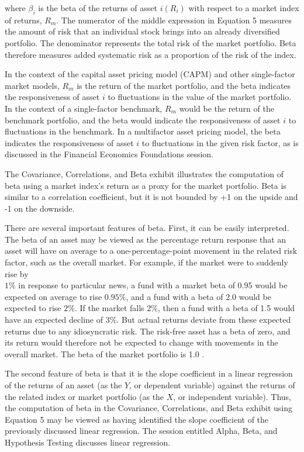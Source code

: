 \documentclass[11pt]{article}
\begin{document}
where $\beta_{i}$ is the beta of the returns of asset $i\left(R_{i}\right)$ with respect to a market index of returns, $R_{m}$. The numerator of the middle expression in Equation 5 measures the amount of risk that an individual stock brings into an already diversified portfolio. The denominator represents the total risk of the market portfolio. Beta therefore measures added systematic risk as a proportion of the risk of the index.

In the context of the capital asset pricing model (CAPM) and other single-factor market models, $R_{m}$ is the return of the market portfolio, and the beta indicates the responsiveness of asset $i$ to fluctuations in the value of the market portfolio. In the context of a single-factor benchmark, $R_{m}$ would be the return of the benchmark portfolio, and the beta would indicate the responsiveness of asset $i$ to fluctuations in the benchmark. In a multifactor asset pricing model, the beta indicates the responsiveness of asset $i$ to fluctuations in the given risk factor, as is discussed in the Financial Economics Foundations session.

The Covariance, Correlations, and Beta exhibit illustrates the computation of beta using a market index's return as a proxy for the market portfolio. Beta is similar to a correlation coefficient, but it is not bounded by +1 on the upside and -1 on the downside.

There are several important features of beta. First, it can be easily interpreted. The beta of an asset may be viewed as the percentage return response that an asset will have on average to a one-percentage-point movement in the related risk factor, such as the overall market. For example, if the market were to suddenly rise by\\
$1 \%$ in response to particular news, a fund with a market beta of 0.95 would be expected on average to rise $0.95 \%$, and a fund with a beta of 2.0 would be expected to rise $2 \%$. If the market falls $2 \%$, then a fund with a beta of 1.5 would have an expected decline of $3 \%$. But actual returns deviate from these expected returns due to any idiosyncratic risk. The risk-free asset has a beta of zero, and its return would therefore not be expected to change with movements in the overall market. The beta of the market portfolio is 1.0 .

The second feature of beta is that it is the slope coefficient in a linear regression of the returns of an asset (as the $Y$, or dependent variable) against the returns of the related index or market portfolio (as the $X$, or independent variable). Thus, the computation of beta in the Covariance, Correlations, and Beta exhibit using Equation 5 may be viewed as having identified the slope coefficient of the previously discussed linear regression. The session entitled Alpha, Beta, and Hypothesis Testing discusses linear regression.
\end{document}
